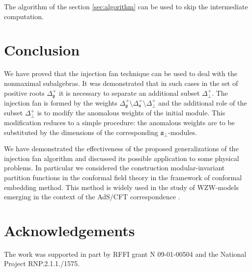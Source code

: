 \documentclass[a4paper,12pt]{article}
\theoremstyle{definition} \newtheorem{Def}{Definition}
\begin{document}
The algorithm of the section \ref{sec:algorithm} can be used to skip the intermediate computation.

\section{Conclusion}
\label{sec:conclusion}
We have proved that the injection fan technique can be used to deal with the nonmaximal subalgebras. It was demonstrated that in such cases in the set of positive roots $\Delta_{\mathfrak{g}}^{+}$ it is necessary to  separate an additional subset $\Delta^{+}_{\bot}$. The injection fan is formed by the weights $\Delta_{\mathfrak{g}}^{+} \setminus  \Delta_{\mathfrak{a}}^{+} \setminus \Delta^{+}_{\bot}$ and the additional role of the subset $\Delta^{+}_{\bot}$ is to modify the anomalous weights of the initial module. This modification reduces to a simple procedure: the anomalous weights are to be substituted by the dimensions of the corresponding ${\mathfrak{a}}_{\bot}$-modules.      
 
We have demonstrated the effectiveness of the proposed generalizations of the injection fan algorithm and discussed its possible application to some physical problems. In particular we considered the construction modular-invariant partition functions in the conformal field theory in the framework of conformal embedding method. This  method is widely used in the study of WZW-models emerging in the context of the AdS/CFT correspondence \cite{Maldacena:2000hw,Maldacena:2000kv,Maldacena:2001km}.


\section{Acknowledgements}
The work was supported in
part by RFFI grant N 09-01-00504 and the National Project RNP.2.1.1./1575.

{}

\end{document}
